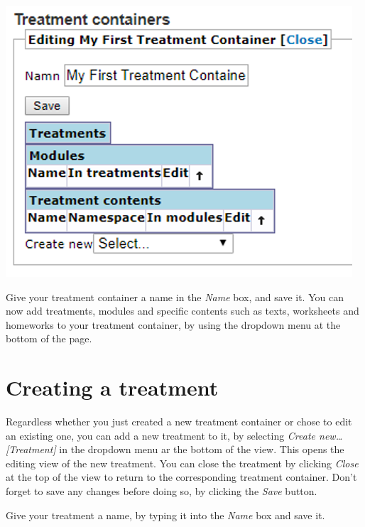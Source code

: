 \documentclass[]{book}
\begin{document}
\includegraphics{images/new-images/treatmentsEditContainer.png}

Give your treatment container a name in the \emph{Name} box, and save it.
You can now add treatments, modules and specific contents such as texts, worksheets and homeworks to your treatment container, by using the dropdown menu at the bottom of the page.

\hypertarget{creating-a-treatment}{%
\section{Creating a treatment}\label{creating-a-treatment}}

Regardless whether you just created a new treatment container or chose to edit an existing one, you can add a new treatment to it, by selecting \emph{Create new\ldots{} {[}Treatment{]}} in the dropdown menu ar the bottom of the view. This opens the editing view of the new treatment. You can close the treatment by clicking \emph{Close} at the top of the view to return to the corresponding treatment container. Don't forget to save any changes before doing so, by clicking the \emph{Save} button.

Give your treatment a name, by typing it into the \emph{Name} box and save it.
\end{document}
